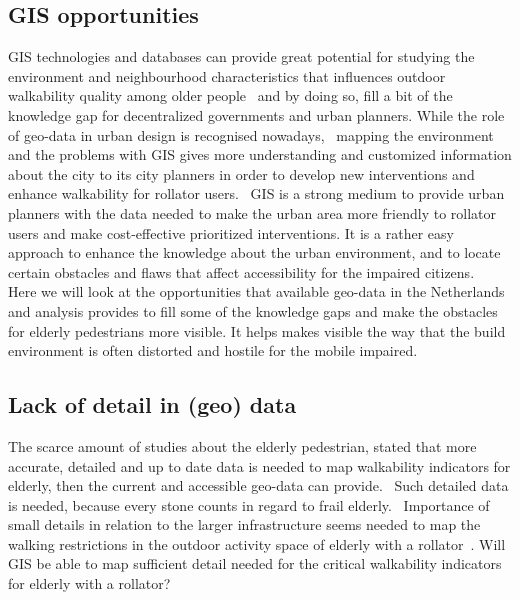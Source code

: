 \subsection{GIS opportunities}
GIS technologies and databases can provide great potential for studying the environment and neighbourhood characteristics that influences outdoor walkability quality among older people~\cite{Vine2012} and by doing so, fill a bit of the knowledge gap for decentralized governments and urban planners. While the role of geo-data in urban design is recognised nowadays,~\cite{Matthews2003} mapping the environment and the problems with GIS gives more understanding and customized information about the city to its city planners in order to develop new interventions and enhance walkability for rollator users.~\cite{Matthews2003, Svensson2010} GIS is a strong medium to provide urban planners with the data needed to make the urban area more friendly to rollator users and make cost-effective prioritized interventions. It is a rather easy approach to enhance the knowledge about the urban environment, and to locate certain obstacles and flaws that affect accessibility for the impaired citizens.~\cite{Svensson2010} Here we will look at the opportunities that available geo-data in the Netherlands and analysis provides to fill some of the knowledge gaps and make the obstacles for elderly pedestrians more visible. 
It helps makes visible the way that the build environment is often distorted and hostile for the mobile impaired.~\cite{Matthews2003}

\subsection{Lack of detail in (geo) data}
The scarce amount of studies about the elderly pedestrian, stated that more accurate, detailed and up to date data is needed to map walkability indicators for elderly, then the current and accessible geo-data can provide.~\cite{Verschuur2013, Laakso2011} Such detailed data is needed, because every stone counts in regard to frail elderly.~\cite{Matthews2003, Laakso2011} Importance of small details in relation to the larger infrastructure seems needed to map the walking restrictions in the outdoor activity space of elderly with a rollator~\cite{Stahl2008, Stahl2013}. Will GIS be able to map sufficient detail needed for the critical walkability indicators for elderly with a rollator? 

